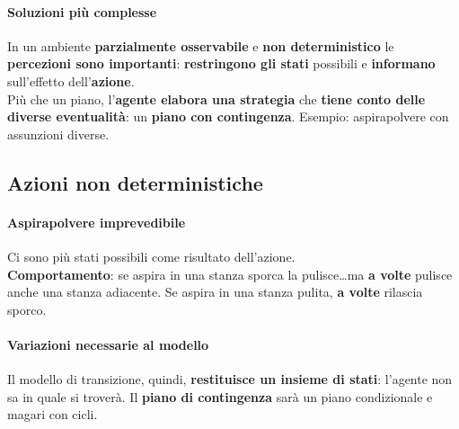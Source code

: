 \documentclass[10pt]{book}
\begin{document}
\paragraph{Soluzioni più complesse} In un ambiente \textbf{parzialmente osservabile} e \textbf{non deterministico} le \textbf{percezioni sono importanti}: \textbf{restringono gli stati} possibili e \textbf{informano} sull'effetto dell'\textbf{azione}.\\
Più che un piano, l'\textbf{agente elabora una strategia} che \textbf{tiene conto delle diverse eventualità}: un \textbf{piano con contingenza}. Esempio: aspirapolvere con assunzioni diverse.
\subsection{Azioni non deterministiche}
\paragraph{Aspirapolvere imprevedibile} Ci sono più stati possibili come risultato dell'azione.\\
\textbf{Comportamento}: se aspira in una stanza sporca la pulisce\ldots ma \textbf{a volte} pulisce anche una stanza adiacente. Se aspira in una stanza pulita, \textbf{a volte} rilascia sporco.
\paragraph{Variazioni necessarie al modello} Il modello di transizione, quindi, \textbf{restituisce un insieme di stati}: l'agente non sa in quale si troverà. Il \textbf{piano di contingenza} sarà un piano condizionale e magari con cicli.
\end{document}

